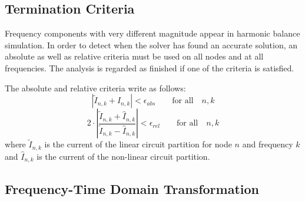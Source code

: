 \subsection{Termination Criteria}

Frequency components with very different magnitude appear in harmonic
balance simulation. In order to detect when the solver has found an
accurate solution, an absolute as well as relative criteria must be
used on all nodes and at all frequencies. The analysis is regarded as
finished if one of the criteria is satisfied.

\addvspace{12pt}

The absolute and relative criteria write as follows:
\begin{equation}
\left| \tilde{I}_{n,k} + \hat{I}_{n,k} \right| < \epsilon_{abs}
  \qquad \text{for all} \quad n, k
\end{equation}
\begin{equation}
2\cdot \left| \frac{\tilde{I}_{n,k} + \hat{I}_{n,k}}
                   {\tilde{I}_{n,k} - \hat{I}_{n,k}} \right|
  < \epsilon_{rel}  \qquad \text{for all} \quad n, k
\end{equation}
where $\tilde{I}_{n,k}$ is the current of the linear circuit
partition for node $n$ and frequency $k$ and $\hat{I}_{n,k}$
is the current of the non-linear circuit partition.


\subsection{Frequency-Time Domain Transformation}

